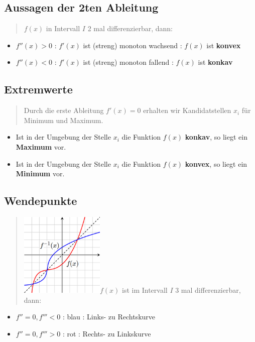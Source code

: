 \subsection*{Aussagen der 2ten Ableitung}
\begin{quote}
$f(x)$ in Intervall $I$ 2 mal differenzierbar, dann:\end{quote}
\begin{itemize}
\item \textbf{$f''(x)>0$} : $f'(x)$ ist (streng) monoton wachsend : $f(x)$
ist \textbf{konvex}
\item \textbf{$f''(x)<0$ }: $f'(x)$ ist (streng) monoton fallend : $f(x)$
ist \textbf{konkav}
\end{itemize}

\subsection*{Extremwerte}
\begin{quote}
Durch die erste Ableitung $f'(x)=0$ erhalten wir Kandidatstellen
$x_{i}$ für Minimum und Maximum.\end{quote}
\begin{itemize}
\item Ist in der Umgebung der Stelle $x_{i}$ die Funktion $f(x)$ \textbf{konkav},
so liegt ein \textbf{Maximum} vor.
\item Ist in der Umgebung der Stelle $x_{i}$ die Funktion $f(x)$ \textbf{konvex},
so liegt ein \textbf{Minimum} vor.
\end{itemize}

\subsection*{Wendepunkte}
\begin{quote}
\includegraphics[width=4cm]{Differentialrechnung/220px-Inverse_Function_Graph}$f(x)$
ist im Intervall $I$ 3 mal differenzierbar, dann:\end{quote}
\begin{itemize}
\item $f''=0,f'''<0$ : blau : Links- zu Rechtskurve
\item $f''=0,f'''>0$ : rot : Rechts- zu Linkskurve
\end{itemize}

